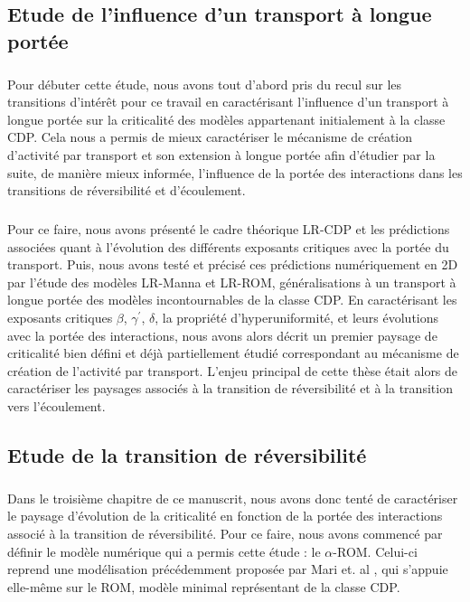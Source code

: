 \subsection*{Etude de l'influence d'un transport à longue portée}

\subparagraph{}Pour débuter cette étude, nous avons tout d'abord pris du recul sur les transitions d'intérêt pour ce travail en caractérisant l'influence d'un transport à longue portée sur la criticalité des modèles appartenant initialement à la classe CDP. Cela nous a permis de mieux caractériser le mécanisme de création d'activité par transport et son extension à longue portée afin d'étudier par la suite, de manière mieux informée, l'influence de la portée des interactions dans les transitions de réversibilité et d'écoulement. 

\subparagraph{}Pour ce faire, nous avons présenté le cadre théorique LR-CDP et les prédictions associées quant à l'évolution des différents exposants critiques avec la portée du transport. Puis, nous avons testé et précisé ces prédictions numériquement en 2D par l'étude des modèles LR-Manna et LR-ROM, généralisations à un transport à longue portée des modèles incontournables de la classe CDP. En caractérisant les exposants critiques $\beta$, $\gamma^\prime$, $\delta$, la propriété d'hyperuniformité, et leurs évolutions avec la portée des interactions, nous avons alors décrit un premier paysage de criticalité bien défini et déjà partiellement étudié correspondant au mécanisme de création de l'activité par transport. L'enjeu principal de cette thèse était alors de caractériser les paysages associés à la transition de réversibilité et à la transition vers l'écoulement.

\subsection*{Etude de la transition de réversibilité}

\subparagraph{}Dans le troisième chapitre de ce manuscrit, nous avons donc tenté de caractériser le paysage d'évolution de la criticalité en fonction de la portée des interactions associé à la transition de réversibilité. Pour ce faire, nous avons commencé par définir le modèle numérique qui a permis cette étude : le $\alpha$-ROM. Celui-ci reprend une modélisation précédemment proposée par Mari et. al \cite{mari_absorbing_2022}, qui s'appuie elle-même sur le ROM, modèle minimal représentant de la classe CDP. 

